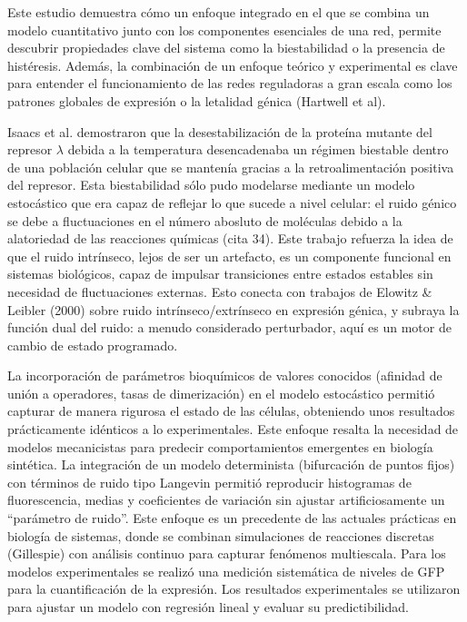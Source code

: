 \documentclass[nochap]{config/ejercicios}
\begin{document}
Este estudio demuestra cómo un enfoque integrado en el que se combina un modelo cuantitativo junto con los componentes esenciales de una red, permite descubrir propiedades clave del sistema como la biestabilidad o la presencia de histéresis. Además, la combinación de un enfoque teórico y experimental es clave para entender el funcionamiento de las redes reguladoras a gran escala como los patrones globales de expresión o la letalidad génica (Hartwell et al).

Isaacs et al. demostraron que la desestabilización de la proteína mutante del represor $\lambda$ debida a la temperatura desencadenaba un régimen biestable dentro de una población celular que se mantenía gracias a la retroalimentación positiva del represor. Esta biestabilidad sólo pudo modelarse mediante un modelo estocástico que era capaz de reflejar lo que sucede a nivel celular: el ruido génico se debe a fluctuaciones en el número abosluto de moléculas debido a la alatoriedad de las reacciones químicas (cita 34). Este trabajo refuerza la idea de que el ruido intrínseco, lejos de ser un artefacto, es un componente funcional en sistemas biológicos, capaz de impulsar transiciones entre estados estables sin necesidad de fluctuaciones externas. Esto conecta con trabajos de Elowitz \& Leibler (2000) sobre ruido intrínseco/extrínseco en expresión génica, y subraya la función dual del ruido: a menudo considerado perturbador, aquí es un motor de cambio de estado programado.



La incorporación de parámetros bioquímicos de valores conocidos (afinidad de unión a operadores, tasas de dimerización) en el modelo estocástico permitió capturar de manera rigurosa el estado de las células, obteniendo unos resultados prácticamente idénticos a lo experimentales. Este enfoque resalta la necesidad de modelos mecanicistas para predecir comportamientos emergentes en biología sintética.
La integración de un modelo determinista (bifurcación de puntos fijos) con términos de ruido tipo Langevin permitió reproducir histogramas de fluorescencia, medias y coeficientes de variación sin ajustar artificiosamente un “parámetro de ruido”. Este enfoque es un precedente de las actuales prácticas en biología de sistemas, donde se combinan simulaciones de reacciones discretas (Gillespie) con análisis continuo para capturar fenómenos multiescala. Para los modelos experimentales se realizó una medición sistemática de niveles de GFP para la cuantificación de la expresión. Los resultados experimentales se utilizaron para ajustar un modelo con regresión lineal y evaluar su predictibilidad. 
\end{document}
